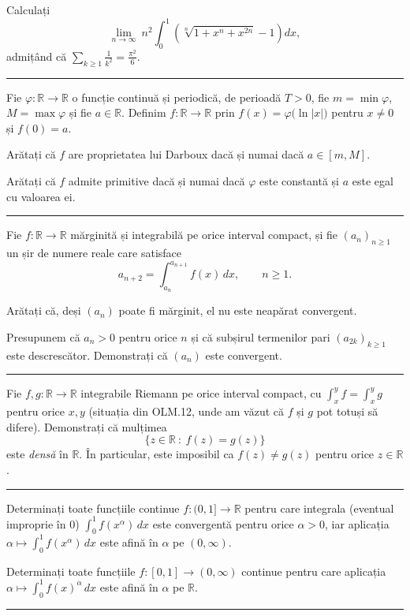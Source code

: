 Calculați
\[ \lim_{n\to\infty}\ n^{2}\int_{0}^{1}\left(\sqrt[n]{1+x^{n}+x^{2n}}-1\right)dx , \]
admițând că $\displaystyle\sum_{k\ge1}\frac{1}{k^{2}}=\frac{\pi^{2}}{6}$.
\vspace{1mm}\hrule

Fie $\varphi:\mathbb{R}\to\mathbb{R}$ o funcție continuă și periodică, de perioadă $T>0$,
fie $m=\min\varphi$, $M=\max\varphi$ și fie $a\in\mathbb{R}$. Definim
$f:\mathbb{R}\to\mathbb{R}$ prin $f(x)=\varphi\bigl(\ln|x|\bigr)$ pentru $x\neq0$ și $f(0)=a$.
\begin{parti}
  \item Arătați că $f$ are proprietatea lui Darboux dacă și numai dacă $a\in[m,M]$.
  \item Arătați că $f$ admite primitive dacă și numai dacă $\varphi$ este constantă și
        $a$ este egal cu valoarea ei.
\end{parti}
\vspace{1mm}\hrule

Fie $f:\mathbb{R}\to\mathbb{R}$ mărginită și integrabilă pe orice interval
compact, și fie $(a_n)_{n\ge1}$ un șir de numere reale care satisface
\[ a_{n+2}=\int_{a_n}^{a_{n+1}}f(x)\,dx,\qquad n\ge1. \]
\begin{parti}
  \item Arătați că, deși $(a_n)$ poate fi mărginit, el nu este neapărat convergent.
  \item Presupunem că $a_n>0$ pentru orice $n$ și că subșirul termenilor pari
        $(a_{2k})_{k\ge1}$ este descrescător. Demonstrați că $(a_n)$ este
        convergent.
\end{parti}
\vspace{1mm}\hrule

Fie $f,g:\mathbb{R}\to\mathbb{R}$ integrabile Riemann pe orice interval compact,
cu $\int_x^{y}f=\int_x^{y}g$ pentru orice $x,y$ (situația din OLM.12, unde am văzut
că $f$ și $g$ pot totuși să difere). Demonstrați că mulțimea
\[ \{z\in\mathbb{R}\ :\ f(z)=g(z)\} \]
este \emph{densă} în $\mathbb{R}$. În particular, este imposibil ca
$f(z)\neq g(z)$ pentru orice $z\in\mathbb{R}$.
\vspace{1mm}\hrule

\begin{parti}
  \item Determinați toate funcțiile continue $f:(0,1]\to\mathbb{R}$ pentru care
        integrala (eventual improprie în $0$) $\displaystyle\int_0^{1}f(x^{\alpha})\,dx$
        este convergentă pentru orice $\alpha>0$, iar aplicația
        $\alpha\mapsto\displaystyle\int_0^{1}f(x^{\alpha})\,dx$ este afină în
        $\alpha$ pe $(0,\infty)$.
  \item Determinați toate funcțiile $f:[0,1]\to(0,\infty)$ continue pentru care
        aplicația $\alpha\mapsto\displaystyle\int_0^{1}f(x)^{\alpha}\,dx$ este
        afină în $\alpha$ pe $\mathbb{R}$.
\end{parti}
\vspace{1mm}\hrule

